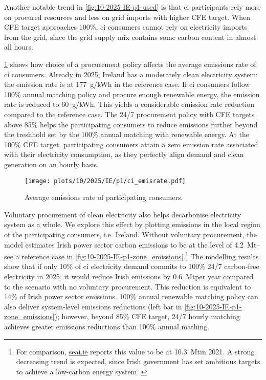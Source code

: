Another notable trend in \cref{fig:10-2025-IE-p1-used} is that \gls{ci} participants rely more on procured resources and less on grid imports with higher CFE target.
When CFE target approaches 100\%, \gls{ci} consumers cannot rely on electricity imports from the grid, since the grid supply mix contains some carbon content in almost all hours.

\cref{fig:10-2025-IE-p1-ci_emisrate} shows how choice of a procurement policy affects the average emissions rate of \gls{ci} consumers.
Already in 2025, Ireland has a moderately clean electricity system: the emission rate is at 177~g\co/kWh in the reference case. 
If \gls{ci} consumers follow 100\% annual matching policy and procure enough renewable energy, the emission rate is reduced to 60~g\co/kWh.
This yields a considerable emission rate reduction compared to the reference case.
The 24/7 procurement policy with CFE targets above 85\% helps the participating consumers to reduce emissions further beyond the treshhold set by the 100\% annual matching with renewable energy. 
At the 100\% CFE target, participating consumers attain a zero emission rate associated with their electricity consumption, as they perfectly align demand and clean generation on an hourly basis.

\begin{figure}
    \centering
    \texttt{[image: plots/10/2025/IE/p1/ci\_emisrate.pdf]}
    \caption{Average emissions rate of participating consumers.}
    \label{fig:10-2025-IE-p1-ci_emisrate}
\end{figure}

Voluntary procurement of clean electricity also helps decarbonise electricity system as a whole.
We explore this effect by plotting \co emissions in the local region of the participating consumers, i.e. Ireland.
Without voluntary procurement, the model estimates Irish power sector carbon emissions to be at the level of 4.2~Mt\co -- see a reference case in \cref{fig:10-2025-IE-p1-zone_emissions}.\footnote{For comparison, \href{https://www.seai.ie/data-and-insights/seai-statistics/key-publications/co2-emissions-report/}{seai.ie} reports this value to be at 10.3~Mt\co in 2021. A strong decreasing trend is expected, since Irish government has set ambitious targets to achieve a low-carbon energy system \cite{seaiCOEmissionsReport2020}.}
The modelling results show that if only 10\% of \gls{ci} electricity demand commits to 100\% 24/7 carbon-free electricity in 2025, it would reduce Irish emissions by 0.6~Mt\co per year compared to the scenario with no voluntary procurement.
This reduction is equivalent to 14\% of Irish power sector emissions.
100\% annual renewable matching policy can also deliver system-level \co emissions reductions (left bar in \cref{fig:10-2025-IE-p1-zone_emissions}); however, beyond 85\% CFE target, 24/7 hourly matching achieves greater emissions reductions than 100\% annual mathing.

